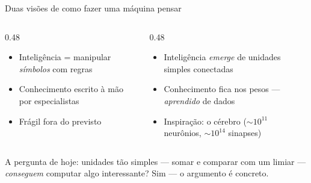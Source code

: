 \documentclass[aspectratio=169, 11pt]{beamer}
\begin{document}
\begin{frame}{Duas visões de como fazer uma máquina pensar}
  \begin{columns}[T]
    \begin{column}{0.48\textwidth}
      \begin{tcolorbox}[iccaixa=icCinza, title={IA simbólica}]
        \begin{itemize}\setlength{\itemsep}{0.2ex}
          \item Inteligência = manipular \emph{símbolos} com regras
          \item Conhecimento escrito à mão por especialistas
          \item Frágil fora do previsto
        \end{itemize}
      \end{tcolorbox}
    \end{column}
    \begin{column}{0.48\textwidth}
      \begin{tcolorbox}[iccaixa=icNeural, title={Conexionismo}]
        \begin{itemize}\setlength{\itemsep}{0.2ex}
          \item Inteligência \emph{emerge} de unidades simples conectadas
          \item Conhecimento fica nos \alert{pesos} — \emph{aprendido}
                de dados
          \item Inspiração: o cérebro ($\sim 10^{11}$ neurônios,
                $\sim 10^{14}$ sinapses)
        \end{itemize}
      \end{tcolorbox}
    \end{column}
  \end{columns}

  \vspace{-0.25em}
  \begin{ideiabox}
    A pergunta de hoje: unidades tão simples — somar e comparar com um limiar
    — \emph{conseguem} computar algo interessante? Sim — o argumento é
    concreto.
  \end{ideiabox}
\end{frame}
\end{document}
